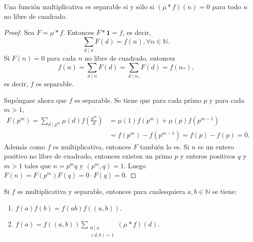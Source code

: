 \begin{lemma}
Una función multiplicativa es separable si y sólo si $(\mu * f)(n)=0$ para todo $n$ no libre de cuadrado.
\end{lemma}
\begin{proof}
Sea $F=\mu * f$. Entonces $F*\mathbf{1}=f$, es decir,
\begin{equation*}
    \sum_{d \mid n} F(d) = f(n), \forall n \in \mathbb{N}.
\end{equation*}
Si $F(n)=0$ para cada $n$ no libre de cuadrado, entonces
\begin{equation*}
    f(n) = \sum_{d \mid n} F(d) = \sum_{d \mid n_*} F(d) = f(n_*),
\end{equation*}
es decir, $f$ es separable.
\bigskip

Supóngase ahora que $f$ es separable. Se tiene que para cada primo $p$ y para cada $m>1$,
\begin{align*}
    F(p^m) = \sum_{d \mid p^m} \mu(d) f \left( \frac{p^m}{d} \right) &= \mu(1)f(p^m) + \mu(p)f(p^{m-1}) \\
                                                                     &= f(p^m) - f(p^{m-1}) = f(p) - f(p) = 0.
\end{align*}
Además como $f$ es multiplicativa, entonces $F$ también lo es. Si $n$ es un entero positivo no libre de cuadrado, entonces existen un primo $p$ y enteros positivos $q$ y $m>1$ tales que $n=p^m q$ y $(p^m,q)=1$. Luego $F(n)=F(p^m)F(q)=0 \cdot F(q)=0$.
\end{proof}

\begin{lemma}\label{lem:par0}
Si $f$ es multiplicativa y separable, entonces para cualesquiera $a,b \in \mathbb{N}$ se tiene:
\begin{enumerate}[label=\textnormal{(\roman*)}]
\item $f(a)f(b)=f(a b)f((a,b))$.
\item $\displaystyle f(a) = f((a,b)) \sum_{\substack{d \mid a \\ (d,b) = 1}} (\mu * f)(d)$.
\end{enumerate}
\end{lemma}

